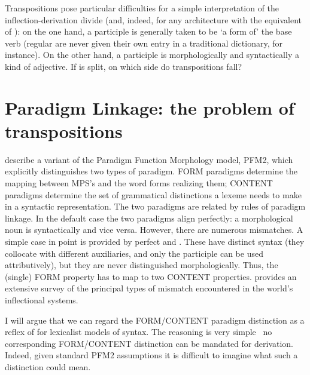 \documentclass[output=paper,
modfonts
]{LSP/langsci}
\begin{document}
Transpositions pose particular difficulties for a simple interpretation of the inflection-derivation divide (and, indeed, for any architecture with the equivalent of ): on the one hand, a participle is generally taken to be ‘a form of’ the base verb (regular  are never given their own entry in a traditional dictionary, for instance). On the other hand, a participle is morphologically and syntactically a kind of adjective. If  is split, on which side do transpositions fall?

\section{Paradigm Linkage: the problem of transpositions} \label{section:linkage}


\citet{Spencer:Stump13:Hungproncase} %
\parencite[see also][]{Bonami:Stump16:PFM,Stump16:book} %
describe a variant of the Paradigm Function Morphology model, PFM2, which explicitly distinguishes two types of paradigm. FORM paradigms determine the mapping between MPS’s and the word forms realizing them; CONTENT paradigms determine the set of grammatical distinctions a lexeme needs to make in a syntactic representation. The two paradigms are related by rules of paradigm linkage. In the default case the two paradigms align perfectly: a morphological  noun is syntactically  and vice versa. However, there are numerous mismatches. A simple case in point is provided by  perfect and  . These have distinct syntax (they collocate with different auxiliaries, and only the  participle can be used attributively), but they are never distinguished morphologically. Thus, the (single) FORM property %
\parencite[say, VFORM:en-ptcp, or the output of a function f\textsubscript{\textit{en}}, as in ][]{Aronoff94:book} %
has to map to two CONTENT properties. \citet{Stump16:book} provides an extensive survey of the principal types of mismatch encountered in the world’s inflectional systems.

I will argue that we can regard the FORM/CONTENT paradigm distinction as a reflex of  for  lexicalist models of syntax. The reasoning is very simple \textemdash\ no corresponding FORM/CONTENT distinction can be mandated for derivation. Indeed, given standard PFM2 assumptions it is difficult to imagine what such a distinction could mean.
\end{document}
